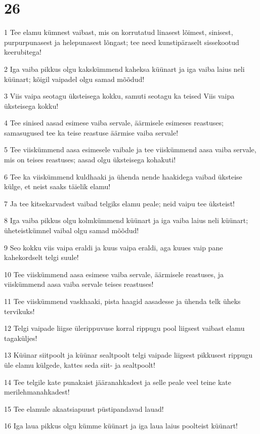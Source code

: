 \chapter{26}

\par 1 Tee elamu kümnest vaibast, mis on korrutatud linasest lõimest, sinisest, purpurpunasest ja helepunasest lõngast; tee need kunstipäraselt sissekootud keerubitega!
\par 2 Iga vaiba pikkus olgu kakskümmend kaheksa küünart ja iga vaiba laius neli küünart; kõigil vaipadel olgu samad mõõdud!
\par 3 Viis vaipa seotagu üksteisega kokku, samuti seotagu ka teised Viis vaipa üksteisega kokku!
\par 4 Tee sinised aasad esimese vaiba servale, äärmisele esimeses reastuses; samasugused tee ka teise reastuse äärmise vaiba servale!
\par 5 Tee viiskümmend aasa esimesele vaibale ja tee viiskümmend aasa vaiba servale, mis on teises reastuses; aasad olgu üksteisega kohakuti!
\par 6 Tee ka viiskümmend kuldhaaki ja ühenda nende haakidega vaibad üksteise külge, et neist saaks täielik elamu!
\par 7 Ja tee kitsekarvadest vaibad telgiks elamu peale; neid vaipu tee üksteist!
\par 8 Iga vaiba pikkus olgu kolmkümmend küünart ja iga vaiba laius neli küünart; üheteistkümnel vaibal olgu samad mõõdud!
\par 9 Seo kokku viis vaipa eraldi ja kuus vaipa eraldi, aga kuues vaip pane kahekordselt telgi suule!
\par 10 Tee viiskümmend aasa esimese vaiba servale, äärmisele reastuses, ja viiskümmend aasa vaiba servale teises reastuses!
\par 11 Tee viiskümmend vaskhaaki, pista haagid aasadesse ja ühenda telk üheks tervikuks!
\par 12 Telgi vaipade liigse ülerippuvuse korral rippugu pool liigsest vaibast elamu tagaküljes!
\par 13 Küünar siitpoolt ja küünar sealtpoolt telgi vaipade liigsest pikkusest rippugu üle elamu külgede, kattes seda siit- ja sealtpoolt!
\par 14 Tee telgile kate punakaist jääranahkadest ja selle peale veel teine kate merilehmanahkadest!
\par 15 Tee elamule akaatsiapuust püstipandavad lauad!
\par 16 Iga laua pikkus olgu kümme küünart ja iga laua laius poolteist küünart!
